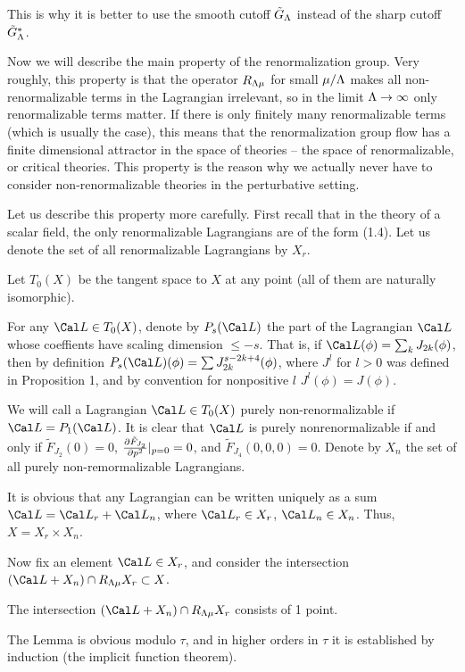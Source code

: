 This is why it is better to use the smooth cutoff $\tilde G_\Lambda$
instead of the sharp cutoff $\tilde G^*_\Lambda$.
 
Now we will describe the main property of the renormalization group.  
Very roughly, this property is that 
the operator $R_{\Lambda\mu}$ 
for small $\mu/\Lambda$ makes all non-renormalizable terms in the Lagrangian
irrelevant, so in the limit $\Lambda\to \infty$ only renormalizable terms matter.
If there is only finitely many renormalizable terms (which is usually 
the case), this means that the renormalization group flow
has a finite dimensional attractor in the space of theories -- 
the space of renormalizable, or critical theories.  
This property is the reason why we actually never have to consider
non-renormalizable theories in the perturbative setting. 

Let us describe this property more carefully.
First recall that in the theory of a scalar field, the only
renormalizable Lagrangians are of the form (1.4).
Let us denote the set of all renormalizable 
Lagrangians by $X_r$.

Let $T_0(X)$ be the tangent space to $X$ at any point
(all of them are naturally isomorphic). 

For any $\Cal L\in T_0(X)$, denote by $P_s(\Cal L)$ the part of the Lagrangian
$\Cal L$ whose coeffients have scaling dimension $\le -s$. 
That is, if $\Cal L(\phi)=\sum_k J_{2k}(\phi)$,
then by definition $P_s(\Cal L)(\phi)=\sum J_{2k}^{s-2k+4}(\phi)$,
where $J^l$ for $l>0$ was defined in Proposition 1, and
by convention for nonpositive $l$ $J^{l}(\phi)=J(\phi)$.

We will call a Lagrangian $\Cal L\in T_0(X)$ 
purely non-renormalizable if $\Cal L=P_1(\Cal L)$. 
It is clear that $\Cal L$ is purely nonrenormalizable if and only if
$\tilde F_{J_2}(0)=0$,
$\frac{\partial \tilde F_{J_2}}{\partial p^2}|_{p=0}=0$,
and $\tilde F_{J_4}(0,0,0)=0$. 
Denote by $X_n$ the set of all purely non-remormalizable 
Lagrangians. 

It is obvious that 
any Lagrangian can be written uniquely as a sum
$\Cal L=\Cal L_r+\Cal L_n$, where 
$\Cal L_r\in X_r$, $\Cal L_n\in X_n$. Thus, $X=X_r\times X_n$. 


Now fix an element $\Cal L\in X_r$, and
consider the intersection $(\Cal L+X_n)\cap R_{\L\mu} X_r\subset X$.

 The intersection 
$(\Cal L+X_n)\cap R_{\L\mu} X_r$ consists of 1 point. 
\endproclaim

 The Lemma is obvious modulo $\tau$, 
and in higher orders in $\tau$ it is established by
induction (the implicit function theorem).
\enddemo

